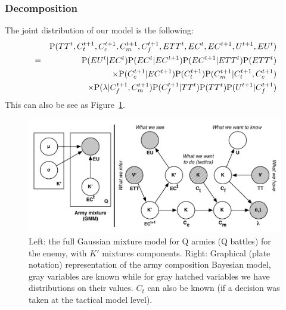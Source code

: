 \subsubsection{Decomposition}
The joint distribution of our model is the following:
\begin{eqnarray}
& & \mathrm{P}(TT^t,C_{t}^{t+1},C_{c}^{t+1},C_{m}^{t+1},C_{f}^{t+1},ETT^t,EC^{t},EC^{t+1},U^{t+1},EU^{t}) \\
& = & \mathrm{P}(EU^t|EC^t)\mathrm{P}(EC^t|EC^{t+1})\mathrm{P}(EC^{t+1}|ETT^t)\mathrm{P}(ETT^t)\\
& & \times \mathrm{P}(C_{c}^{t+1}|EC^{t+1})\mathrm{P}(C_{t}^{t+1})\mathrm{P}(C_{m}^{t+1}|C_{t}^{t+1},C_{c}^{t+1}) \\
& & \times \mathrm{P}(\lambda|C_{f}^{t+1},C_{m}^{t+1})\mathrm{P}(C_{f}^{t+1}|TT^{t})\mathrm{P}(TT^t)\mathrm{P}(U^{t+1}|C_{f}^{t+1})
\end{eqnarray}
This can also be see as Figure~\ref{fig:armycompositionplate}.
\begin{figure}[h]
\centerline{\includegraphics[width=0.84\columnwidth]{images/army_composition_model3.pdf}}
\caption{Left: the full Gaussian mixture model for Q armies (Q battles) for the enemy, with $K'$ mixtures components. Right: Graphical (plate notation) representation of the army composition Bayesian model, gray variables are known while for gray hatched variables we have distributions on their values. $C_t$ can also be known (if a decision was taken at the tactical model level).}
\label{fig:armycompositionplate}
\end{figure}

